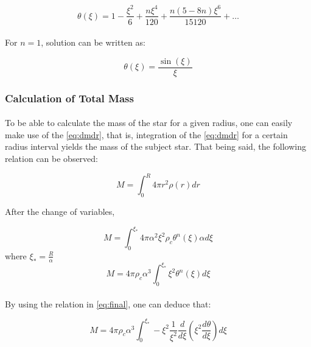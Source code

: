 \documentclass[letterpaper,12pt]{article}
\begin{document}
\begin{equation*}  
      \theta(\xi) =  1-\frac{\xi ^2}{6}+\frac{n \xi ^4}{120}+\frac{n (5-8 n) \xi ^6}{15120}+\dots
\end{equation*}

\paragraph{} For $n = 1$, solution can be written as:

\begin{equation*}
    \theta(\xi) =  \frac{\sin (\xi )}{\xi }
\end{equation*}

\subsubsection{Calculation of Total Mass}

\paragraph{} To be able to calculate the mass of the star for a given radius, one can easily make use of the \eqref{eq:dmdr}, that is, integration of the \eqref{eq:dmdr} for a certain radius interval yields the mass of the subject star. That being said, the following relation can be observed:

\begin{equation*}
   M =  \int_0^R {4\pi r^2 \rho(r)}dr
\end{equation*}

After the change of variables,

\begin{equation*}
    M = \int_0^{\xi_*} {4 \pi \alpha^2 \xi^2 \rho_c \theta^n (\xi)} \alpha d\xi
\end{equation*}
where ${\xi_*} = \frac{R}{\alpha}$
\begin{equation*}
    M =4 \pi \rho_c \alpha^3 \int_0^{\xi_*} {\xi^2 \theta^n (\xi)} d\xi
\end{equation*}

\paragraph{} By using the relation in \eqref{eq:final}, one can deduce that:

\begin{equation*}
    M =4 \pi \rho_c \alpha^3 \int_0^{\xi_*} -{\xi^2 \frac{1}{\xi^2}\frac{d}{d\xi}\left(\xi^2\frac{d\theta}{d\xi}\right) } d\xi
\end{equation*}
\end{document}
